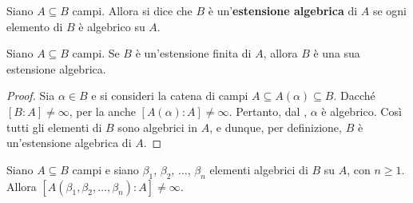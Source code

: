 \begin{definition}
    Siano $A \subseteq B$ campi. Allora si dice che $B$ è
    un'\textbf{estensione algebrica} di $A$ se ogni elemento
    di $B$ è algebrico su $A$.
\end{definition}

\begin{proposition}
    \label{prop:estensione_finita_algebrica}
    Siano $A \subseteq B$ campi. Se $B$ è un'estensione finita
    di $A$, allora $B$ è una sua estensione algebrica.
\end{proposition}

\begin{proof}
    Sia $\alpha \in B$ e si consideri la catena di campi $A \subseteq A(\alpha)
        \subseteq B$. Dacché $[B : A] \neq \infty$, per la 
    anche $[A(\alpha) : A] \neq \infty$. Pertanto, dal , $\alpha$ è algebrico. Così tutti gli elementi
    di $B$ sono algebrici in $A$, e dunque, per definizione, $B$ è un'estensione
    algebrica di $A$.
\end{proof}

\begin{theorem}
    \label{th:somma_prodotto_algebrici}
    Siano $A \subseteq B$ campi e siano $\beta_1$, $\beta_2$, $\ldots$, $\beta_n$
    elementi algebrici di $B$ su $A$, con $n \geq 1$.
    Allora $[A(\beta_1, \beta_2, \ldots, \beta_n) : A] \neq \infty$.
\end{theorem}

